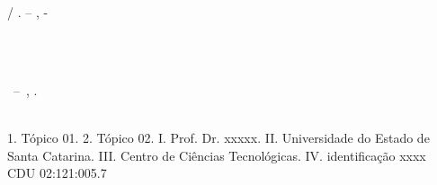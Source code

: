 \imprimircapa

\imprimirfolhaderosto*

%     

\begin{fichacatalografica}
	\vspace*{\fill}					%
	\begin{center}					%
	\begin{minipage}[c]{12.5cm}		%
	
	\imprimirautor
	
	\hspace{0.5cm} \imprimirtitulo  / \imprimirautor. --
	\imprimirlocal, \imprimirdata-
	
	\hspace{0.5cm} %
	
	\hspace{0.5cm} \imprimirorientadorRotulo~\imprimirorientador\\

	\hspace{0.5cm} \imprimircoorientadorRotulo~\imprimircoorientador\\
	
	\hspace{0.5cm}
	\parbox[t]{\textwidth}{\imprimirtipotrabalho~--~\imprimirinstituicao,
	\imprimirdata.}\\
	
	\hspace{0.5cm}
		1. Tópico 01.
		2. Tópico 02.
		I. Prof. Dr. xxxxx.
		II. Universidade do Estado de Santa Catarina.
		III. Centro de Ciências Tecnológicas.
		IV. identificação xxxx\\ 			
	
	\hspace{8.75cm} CDU 02:121:005.7\\
	
	\end{minipage}
	\end{center}
\end{fichacatalografica}

